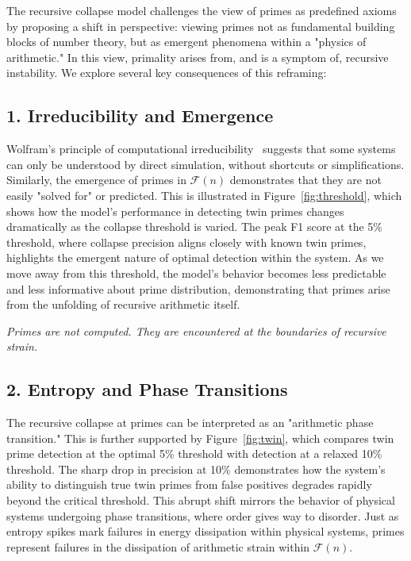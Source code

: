 \documentclass[11pt]{article}
\begin{document}
The recursive collapse model challenges the view of primes as predefined axioms by proposing a shift in perspective: viewing primes not as fundamental building blocks of number theory, but as emergent phenomena within a "physics of arithmetic." In this view, primality arises from, and is a symptom of, recursive instability. We explore several key consequences of this reframing: 


\subsection*{1. Irreducibility and Emergence}

Wolfram's principle of computational irreducibility~\cite{wolfram} suggests that some systems can only be understood by direct simulation, without shortcuts or simplifications. Similarly, the emergence of primes in \(\mathcal{F}(n)\) demonstrates that they are not easily "solved for" or predicted. This is illustrated in Figure~\ref{fig:threshold}, which shows how the model's performance in detecting twin primes changes dramatically as the collapse threshold is varied. The peak F1 score at the 5\% threshold, where collapse precision aligns closely with known twin primes, highlights the emergent nature of optimal detection within the system. As we move away from this threshold, the model's behavior becomes less predictable and less informative about prime distribution, demonstrating that primes arise from the unfolding of recursive arithmetic itself.


\textit{Primes are not computed. They are encountered at the boundaries of recursive strain.}

\subsection*{2. Entropy and Phase Transitions}

The recursive collapse at primes can be interpreted as an "arithmetic phase transition." This is further supported by Figure~\ref{fig:twin}, which compares twin prime detection at the optimal 5\% threshold with detection at a relaxed 10\% threshold. The sharp drop in precision at 10\% demonstrates how the system's ability to distinguish true twin primes from false positives degrades rapidly beyond the critical threshold. This abrupt shift mirrors the behavior of physical systems undergoing phase transitions, where order gives way to disorder. Just as entropy spikes mark failures in energy dissipation within physical systems, primes represent failures in the dissipation of arithmetic strain within \(\mathcal{F}(n)\). 
\end{document}
